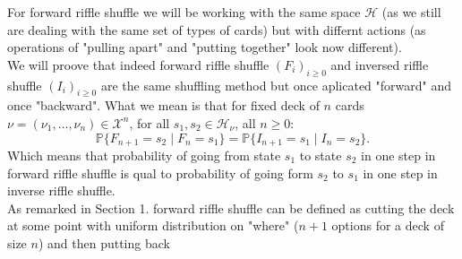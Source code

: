 \documentclass[a4paper, 12pt]{report}
\begin{document}
For forward riffle shuffle we will be working with the same space $\mathcal{H}$ (as we still 
are dealing with the same set of types of cards) but with differnt actions (as operations of "pulling apart" 
and "putting together" look now different). \\
We will proove that indeed forward riffle shuffle $(F_i)_{i \geq 0}$ and inversed riffle shuffle 
$(I_i)_{i \geq 0}$ are the same shuffling method 
but once aplicated "forward" and once "backward". What we mean is that for fixed deck of $n$ cards 
$\nu = (\nu_1, \dots, \nu_n) \in \mathcal{X}^n$, for all $s_1, s_2 \in \mathcal{H}_\nu$, all $n \geq 0$:
\begin{equation*}
\mathbb{P}\{F_{n+1} = s_2 \mid F_n = s_1\} = \mathbb{P}\{I_{n+1} = s_1 \mid I_n = s_2\}.
\end{equation*} 
Which means that probability of going from state $s_1$ to state $s_2$ in one step in forward riffle shuffle 
is qual to probability of going form $s_2$ to $s_1$ in one step in  inverse riffle shuffle. \\
As remarked in Section 1. forward riffle shuffle can be defined as cutting the deck at some point with 
uniform distribution on "where" ($n+1$ options for a deck of size $n$) and then putting back 
\end{document}
